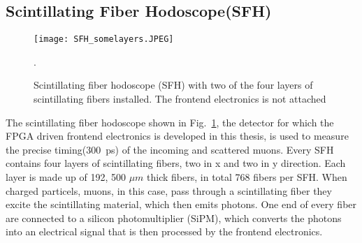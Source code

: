 \subsection{Scintillating Fiber Hodoscope(SFH)}
\begin{figure}[H]
	\centering
	\texttt{[image: SFH\_somelayers.JPEG]}
	\caption{Scintillating fiber hodoscope (SFH) with two of the four layers of scintillating fibers installed. The frontend electronics is not attached\autocite{InternalcommunicationKarl}}.
	\label{SFHpicture}
\end{figure}
The scintillating fiber hodoscope shown in Fig.~\ref{SFHpicture}, 
the detector for which the FPGA driven frontend electronics is developed in this thesis,
is used to measure the precise timing(\SI{300}{\pico\second}\Autocite{Amber2022Status}) of the incoming and scattered muons. 
Every SFH contains four layers of scintillating fibers, two in x and two in y direction.
Each layer is made up of 192\autocite{Amber2022Status}, 500 $\mu m$ thick\autocite{Amber2024Status} fibers, in total 768\autocite{Amber2022Status} fibers per SFH. 
When charged particels, muons, in this case, pass through a scintillating fiber they excite the scintillating material, 
which then emits photons. One end of every fiber are connected to a silicon photomultiplier (SiPM), which converts the photons into an electrical signal
that is then processed by the frontend electronics\autocite{InternalcommunicationKarl}.


